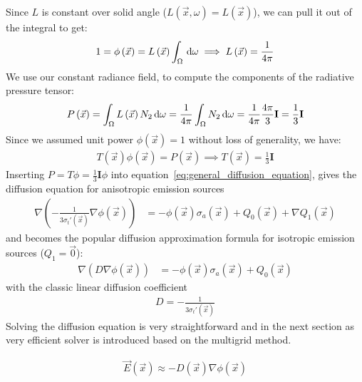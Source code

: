 Since $L$ is constant over solid angle ($L(\vec{x}, \omega)=L(\vec{x})$), we can pull it out of the integral to get:
\begin{align*}
1 = \phi\left(\vec{x}\right) = L\left(\vec{x}\right)\int_\Omega{\,\mathrm{d}\omega}\implies L\left(\vec{x}\right) = \frac{1}{4\pi}
\end{align*}
We use our constant radiance field, to compute the components of the radiative pressure tensor:
\begin{align*}
P\left(\vec{x}\right) 
= \int_\Omega{L\left(\vec{x}\right)N_2\,\mathrm{d}\omega}
= \frac{1}{4\pi}\int_\Omega{N_2\,\mathrm{d}\omega}
= \frac{1}{4\pi}\frac{4\pi}{3}\mathbf{I}
= \frac{1}{3}\mathbf{I}
\end{align*}
Since we assumed unit power $\phi(\vec{x})=1$ without loss of generality, we have:
\begin{align*}
T(\vec{x})\phi(\vec{x}) = P(\vec{x}) \implies T(\vec{x})=\frac{1}{3}\mathbf{I}
\end{align*}
Inserting $P=T\phi=\frac{1}{3}\mathbf{I}\phi$ into equation~\ref{eq:general_diffusion_equation}, gives the diffusion equation for anisotropic emission sources
\begin{align}
\label{eq:diffusion_equation_anisotropic_Q}
\nabla
\left(
-\frac{1}{3\sigma_t'\left(\vec{x}\right)}
\nabla \phi\left(\vec{x}\right)
\right)&=
-\phi(\vec{x})\sigma_a(\vec{x})
+Q_0\left(\vec{x}\right)
+\nabla Q_1\left(\vec{x}\right)
\end{align}
and becomes the popular diffusion approximation formula for isotropic emission sources ($Q_1=\vec{0}$):
\begin{align}
\label{eq:diffusion_equation_anisotropic_Q}
\nabla
\left(
D
\nabla \phi\left(\vec{x}\right)
\right)&=
-\phi(\vec{x})\sigma_a(\vec{x})
+Q_0\left(\vec{x}\right)
\end{align}
with the classic linear diffusion coefficient
\begin{align}
D=-\frac{1}{3\sigma_t'\left(\vec{x}\right)}
\label{eq:da_D}
\end{align}
Solving the diffusion equation is very straightforward and in the next section as very efficient solver is introduced based on the multigrid method.


\begin{align}
\label{eq:diffusion_ficks_law}
\vec{E}\left(\vec{x}\right) \approx -D\left(\vec{x}\right)\nabla\phi\left(\vec{x}\right)
\end{align}
